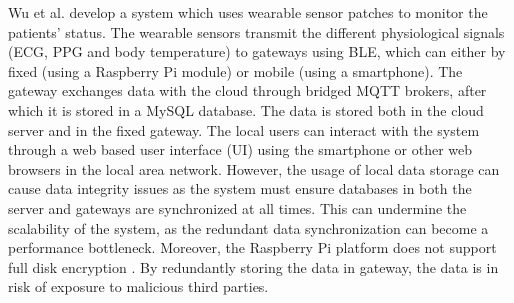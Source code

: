 %
%

Wu et al. \cite{Wu2020} develop a system which uses wearable sensor patches to monitor the patients' status. The wearable sensors transmit the different physiological signals (ECG, PPG and body temperature) to gateways using \acs{BLE}, which can either by fixed (using a Raspberry Pi module) or mobile (using a smartphone). The gateway exchanges data with the cloud through bridged \acs{MQTT} brokers, after which it is stored in a MySQL database. The data is stored both in the cloud server and in the fixed gateway. The local users can interact with the system through a web based user interface (UI) using the smartphone or other web browsers in the local area network. However, the usage of local data storage can cause data integrity issues as the system must ensure databases in both the server and gateways are synchronized at all times. This can undermine the scalability of the system, as the redundant data synchronization can become a performance bottleneck. Moreover, the Raspberry Pi platform does not support full disk encryption \cite{}. By redundantly storing the data in gateway, the data is in risk of exposure to malicious third parties.

%
%

